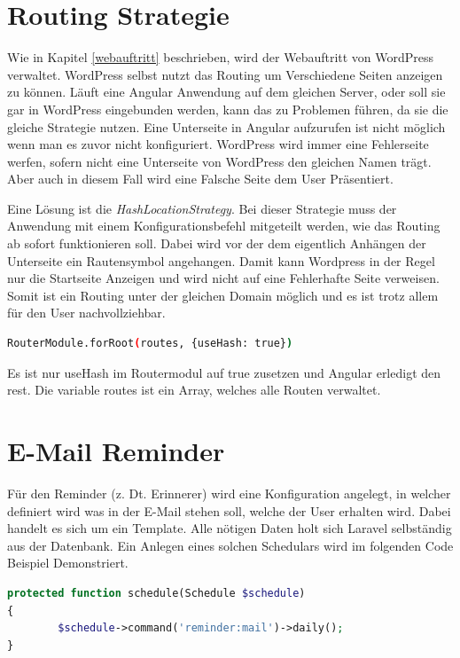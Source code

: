 \section{Routing Strategie}
Wie in Kapitel \ref{webauftritt} beschrieben, wird der Webauftritt von WordPress verwaltet. WordPress selbst nutzt das Routing um Verschiedene Seiten anzeigen zu können. Läuft eine Angular Anwendung auf dem gleichen Server, oder soll sie gar in WordPress eingebunden werden, kann das zu Problemen führen, da sie die gleiche Strategie nutzen. Eine Unterseite in Angular aufzurufen ist nicht möglich wenn man es zuvor nicht konfiguriert. WordPress wird immer eine Fehlerseite werfen, sofern nicht eine Unterseite von WordPress den gleichen Namen trägt. Aber auch in diesem Fall wird eine Falsche Seite dem User Präsentiert.

Eine Lösung ist die \textit{HashLocationStrategy}. Bei dieser Strategie muss der Anwendung mit einem Konfigurationsbefehl mitgeteilt werden, wie das Routing ab sofort funktionieren soll. Dabei wird vor der dem eigentlich Anhängen der Unterseite ein Rautensymbol angehangen. Damit kann Wordpress in der Regel nur die Startseite Anzeigen und wird nicht auf eine Fehlerhafte Seite verweisen. Somit ist ein Routing unter der gleichen Domain möglich und es ist trotz allem für den User nachvollziehbar. 

\begin{lstlisting}[language=sh, frame=single]
RouterModule.forRoot(routes, {useHash: true})
\end{lstlisting}

Es ist nur useHash im Routermodul auf true zusetzen und Angular erledigt den rest. Die variable routes ist ein Array, welches alle Routen verwaltet.



\section{E-Mail Reminder}
Für den Reminder (\ac{z. Dt.} Erinnerer) wird eine Konfiguration angelegt, in welcher definiert wird was in der E-Mail stehen soll, welche der User erhalten wird. Dabei handelt es sich um ein Template. Alle nötigen Daten holt sich Laravel selbständig aus der Datenbank. Ein Anlegen eines solchen Schedulars wird im folgenden Code Beispiel Demonstriert.
\begin{lstlisting}[language=php, frame=single]
protected function schedule(Schedule $schedule)
{
		$schedule->command('reminder:mail')->daily();
}
\end{lstlisting}

